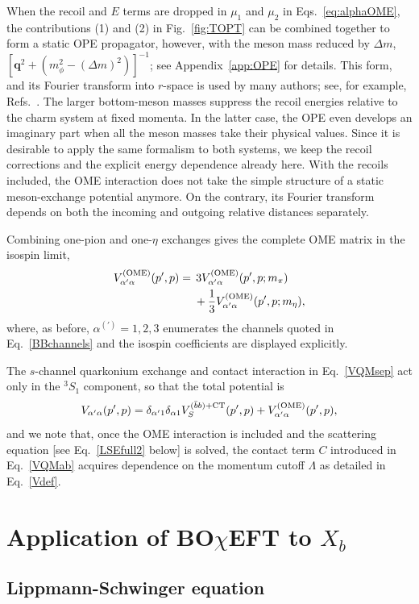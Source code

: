 \documentclass[aps,prd,showpacs,amsmath,twocolumn,superscriptaddress,floatfix,nofootinbib,notitlepage]{revtex4-2}
\newcommand{\veq}{{\bm q}}
\newcommand{\be}{\begin{equation}}
\newcommand{\ee}{\end{equation}}
\newcommand{\QQ}{\bar{b}b}
\newcommand{\Xb}{X_b}
\newcommand{\BOchiEFT}{BO$\chi$EFT\xspace}
\newcommand{\VOME}{V^{\rm (OME)}}
\begin{document}
When the recoil and $E$ terms are dropped in $\mu_1$ and $\mu_2$ in Eqs.~\eqref{eq:alphaOME}, the contributions (1) and (2) in Fig.~\ref{fig:TOPT} can be combined together to form a static OPE propagator, however, with the meson mass reduced by
$\Delta m$, $[\veq^2+(m_\phi^2-(\Delta m)^2)]^{-1}$; see Appendix~\ref{app:OPE} for details.
This form, and its Fourier transform into $r$-space is used by many authors; see, for example, Refs.~\cite{Tornqvist:1993ng,Swanson:2003tb,Suzuki:2005ha,Thomas:2008ja}.
The larger bottom-meson masses suppress the recoil energies relative to the charm system at fixed momenta. In the latter case, the OPE even develops an imaginary part when all the meson masses take their physical values. Since it is desirable to apply the same formalism to both systems, we keep the recoil corrections
and the explicit energy dependence already here. With the recoils included, the OME interaction does not 
take the simple structure of a static meson-exchange potential anymore. On the contrary, its Fourier transform depends on both the incoming and outgoing relative distances separately.

Combining one-pion and one-$\eta$ exchanges gives the complete OME matrix in the isospin limit,
\be
\begin{split}
\VOME_{\alpha'\alpha}(p',p)={}&\,
3\VOME_{\alpha'\alpha}(p',p;m_{\pi})\\
&+\frac13 \VOME_{\alpha'\alpha}(p',p;m_\eta),
\label{VOME}
\end{split}
\ee
where, as before, $\alpha^{(\prime)}=1,2,3$ enumerates the channels quoted in Eq.~\eqref{BBchannels} and the isospin coefficients are displayed explicitly. 

The $s$-channel quarkonium exchange and contact interaction in Eq.~\eqref{VQMsep} act only in the $^3S_1$ component, so that the total potential is
\be
V_{\alpha'\alpha}(p',p)=\delta_{\alpha' 1}\delta_{\alpha 1}
V_S^{(\QQ)+{\rm CT}}(p',p)+\VOME_{\alpha'\alpha}(p',p),
\label{Vcoupled}
\ee
and we note that, once the OME interaction is included and the scattering equation [see Eq.~\eqref{LSEfull2} below] is solved, the contact term $C$ introduced in Eq.~\eqref{VQMab} acquires dependence on the momentum cutoff $\Lambda$ as detailed in Eq.~\eqref{Vdef}. 

\section{Application of \BOchiEFT to $\Xb$}
\label{sec:appXb}

\subsection{Lippmann-Schwinger equation}
\label{sec:LSE}
\end{document}
